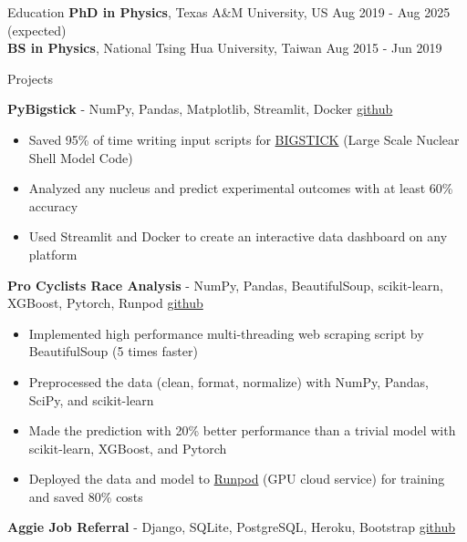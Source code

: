 \documentclass{resume}
\begin{document}
\vspace{-2.75em}
\begin{rSection}{Education}
{\bf PhD in Physics}, Texas A\&M University, US \hfill {Aug 2019 - Aug 2025 (expected)} \\
{\bf BS in Physics}, National Tsing Hua University, Taiwan \hfill {Aug 2015 - Jun 2019}
\vspace{-0.5em}


\begin{rSection}{Projects}
    \vspace{-1.25em}
    \item \textbf{PyBigstick} - {NumPy, Pandas, Matplotlib, Streamlit, Docker} \hfill {\href{https://github.com/noctildon/pyBigstick}{github}}
        \begin{itemize}
        \itemsep -3pt {}
        \item Saved 95\% of time writing input scripts for \href{https://github.com/cwjsdsu/BigstickPublick}{BIGSTICK} (Large Scale Nuclear Shell Model Code)
        \item Analyzed any nucleus and predict experimental outcomes with at least 60\% accuracy
        \item Used Streamlit and Docker to create an interactive data dashboard on any platform
        \end{itemize}
    \item \textbf{Pro Cyclists Race Analysis} - {NumPy, Pandas, BeautifulSoup, scikit-learn, XGBoost, Pytorch, Runpod} \hfill {\href{https://github.com/noctildon/pro_cyclists}{github}}
            \begin{itemize}
            \itemsep -3pt {}
            \item Implemented high performance multi-threading web scraping script by BeautifulSoup (5 times faster)
            \item Preprocessed the data (clean, format, normalize) with NumPy, Pandas, SciPy, and scikit-learn
            \item Made the prediction with 20\% better performance than a trivial model with scikit-learn, XGBoost, and Pytorch
            \item Deployed the data and model to \href{https://www.runpod.io/}{Runpod} (GPU cloud service) for training and saved 80\% costs
            \end{itemize}
    \item \textbf{Aggie Job Referral} - {Django, SQLite, PostgreSQL, Heroku, Bootstrap} \hfill {\href{https://github.com/noctildon/aggie-job-referral}{github}}

\end{rSection}
\end{rSection}
\end{document}
